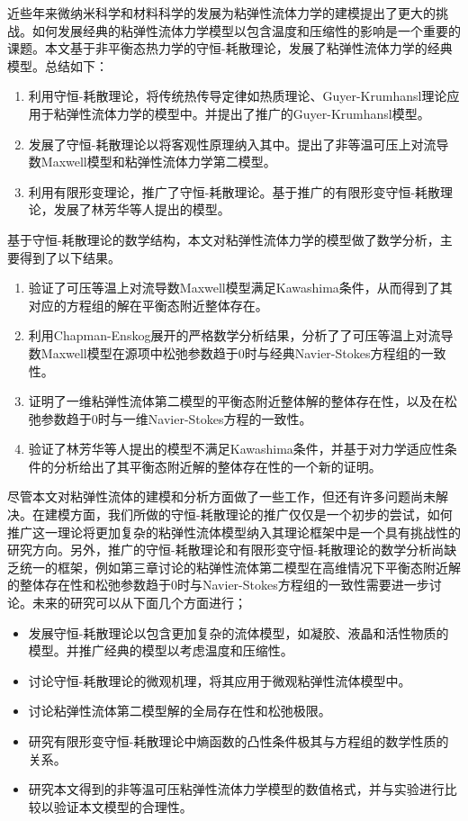 \documentclass{article}
\begin{document}
近些年来微纳米科学和材料科学的发展为粘弹性流体力学的建模提出了更大的挑战。如何发展经典的粘弹性流体力学模型以包含温度和压缩性的影响是一个重要的课题。本文基于非平衡态热力学的守恒-耗散理论，发展了粘弹性流体力学的经典模型。总结如下：
\begin{enumerate}
	\item 利用守恒-耗散理论，将传统热传导定律如热质理论、Guyer-Krumhansl理论应用于粘弹性流体力学的模型中。并提出了推广的Guyer-Krumhansl模型。
	\item 发展了守恒-耗散理论以将客观性原理纳入其中。提出了非等温可压上对流导数Maxwell模型和粘弹性流体力学第二模型。
	\item 利用有限形变理论，推广了守恒-耗散理论。基于推广的有限形变守恒-耗散理论，发展了林芳华等人提出的模型。
\end{enumerate}
基于守恒-耗散理论的数学结构，本文对粘弹性流体力学的模型做了数学分析，主要得到了以下结果。
\begin{enumerate}
	\item 验证了可压等温上对流导数Maxwell模型满足Kawashima条件，从而得到了其对应的方程组的解在平衡态附近整体存在。
	\item 利用Chapman-Enskog展开的严格数学分析结果，分析了了可压等温上对流导数Maxwell模型在源项中松弛参数趋于$0$时与经典Navier-Stokes方程组的一致性。
	\item 证明了一维粘弹性流体第二模型的平衡态附近整体解的整体存在性，以及在松弛参数趋于$0$时与一维Navier-Stokes方程的一致性。
	\item 验证了林芳华等人提出的模型不满足Kawashima条件，并基于对力学适应性条件的分析给出了其平衡态附近解的整体存在性的一个新的证明。
\end{enumerate}

尽管本文对粘弹性流体的建模和分析方面做了一些工作，但还有许多问题尚未解决。在建模方面，我们所做的守恒-耗散理论的推广仅仅是一个初步的尝试，如何推广这一理论将更加复杂的粘弹性流体模型纳入其理论框架中是一个具有挑战性的研究方向。另外，推广的守恒-耗散理论和有限形变守恒-耗散理论的数学分析尚缺乏统一的框架，例如第三章讨论的粘弹性流体第二模型在高维情况下平衡态附近解的整体存在性和松弛参数趋于$0$时与Navier-Stokes方程组的一致性需要进一步讨论。未来的研究可以从下面几个方面进行；
\begin{itemize}
	\item 发展守恒-耗散理论以包含更加复杂的流体模型，如凝胶、液晶和活性物质的模型。并推广经典的模型以考虑温度和压缩性。
	\item 讨论守恒-耗散理论的微观机理，将其应用于微观粘弹性流体模型中。
	\item 讨论粘弹性流体第二模型解的全局存在性和松弛极限。
	\item 研究有限形变守恒-耗散理论中熵函数的凸性条件极其与方程组的数学性质的关系。
	\item 研究本文得到的非等温可压粘弹性流体力学模型的数值格式，并与实验进行比较以验证本文模型的合理性。
\end{itemize}
\end{document}
